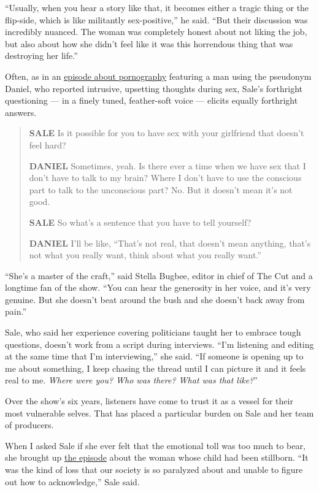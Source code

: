 ``Usually, when you hear a story like that, it becomes either a tragic
thing or the flip-side, which is like militantly sex-positive,'' he
said. ``But their discussion was incredibly nuanced. The woman was
completely honest about not liking the job, but also about how she
didn't feel like it was this horrendous thing that was destroying her
life.''

Often, as in an
\href{https://www.wnycstudios.org/podcasts/deathsexmoney/episodes/porn-death-sex-money}{episode
about pornography} featuring a man using the pseudonym Daniel, who
reported intrusive, upsetting thoughts during sex, Sale's forthright
questioning --- in a finely tuned, feather-soft voice --- elicits
equally forthright answers.

\begin{quote}
\textbf{SALE} Is it possible for you to have sex with your girlfriend
that doesn't feel hard?

\textbf{DANIEL} Sometimes, yeah. Is there ever a time when we have sex
that I don't have to talk to my brain? Where I don't have to use the
conscious part to talk to the unconscious part? No. But it doesn't mean
it's not good.

\textbf{SALE} So what's a sentence that you have to tell yourself?

\textbf{DANIEL} I'll be like, ``That's not real, that doesn't mean
anything, that's not what you really want, think about what you really
want.''
\end{quote}

``She's a master of the craft,'' said Stella Bugbee, editor in chief of
The Cut and a longtime fan of the show. ``You can hear the generosity in
her voice, and it's very genuine. But she doesn't beat around the bush
and she doesn't back away from pain.''

Sale, who said her experience covering politicians taught her to embrace
tough questions, doesn't work from a script during interviews. ``I'm
listening and editing at the same time that I'm interviewing,'' she
said. ``If someone is opening up to me about something, I keep chasing
the thread until I can picture it and it feels real to me. \emph{Where
were you? Who was there? What was that like?}''

Over the show's six years, listeners have come to trust it as a vessel
for their most vulnerable selves. That has placed a particular burden on
Sale and her team of producers.

When I asked Sale if she ever felt that the emotional toll was too much
to bear, she brought up
\href{https://www.wnycstudios.org/podcasts/deathsexmoney/episodes/stillbirth-death-sex-money}{the
episode} about the woman whose child had been stillborn. ``It was the
kind of loss that our society is so paralyzed about and unable to figure
out how to acknowledge,'' Sale said.

